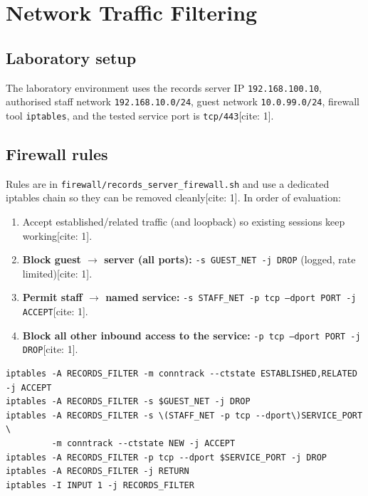 \documentclass[11pt,a4paper]{article}
\begin{document}
\section{Network Traffic Filtering}
\subsection{Laboratory setup}
The laboratory environment uses the records server IP \texttt{192.168.100.10}, authorised staff network \texttt{192.168.10.0/24}, guest network \texttt{10.0.99.0/24}, firewall tool \texttt{iptables}, and the tested service port is \texttt{tcp/443}[cite: 1].

\subsection{Firewall rules}
Rules are in \texttt{firewall/records\_server\_firewall.sh} and use a dedicated iptables chain so they can be removed cleanly[cite: 1].
In order of evaluation:
\begin{enumerate}[nosep]
  \item Accept established/related traffic (and loopback) so existing sessions keep working[cite: 1].
  \item \textbf{Block guest \(\rightarrow\) server (all ports):} \texttt{-s GUEST\_NET -j DROP} (logged, rate limited)[cite: 1].
  \item \textbf{Permit staff \(\rightarrow\) named service:} \texttt{-s STAFF\_NET -p tcp --dport PORT -j ACCEPT}[cite: 1].
  \item \textbf{Block all other inbound access to the service:} \texttt{-p tcp --dport PORT -j DROP}[cite: 1].
\end{enumerate}
\begin{lstlisting}
iptables -A RECORDS_FILTER -m conntrack --ctstate ESTABLISHED,RELATED -j ACCEPT
iptables -A RECORDS_FILTER -s $GUEST_NET -j DROP
iptables -A RECORDS_FILTER -s \(STAFF_NET -p tcp --dport\)SERVICE_PORT \
         -m conntrack --ctstate NEW -j ACCEPT
iptables -A RECORDS_FILTER -p tcp --dport $SERVICE_PORT -j DROP
iptables -A RECORDS_FILTER -j RETURN
iptables -I INPUT 1 -j RECORDS_FILTER
\end{lstlisting}
\end{document}
